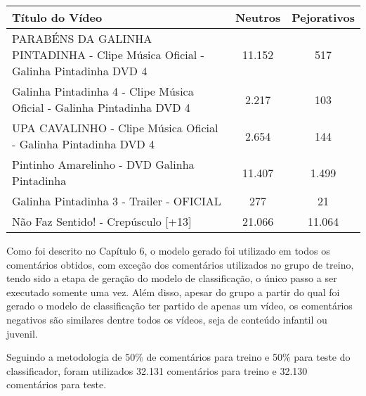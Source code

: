 \begin{table}[H] \footnotesize
\centering
\begin{tabular}{|p{5.5cm}|c|c|}
\hline
\textbf{Título do Vídeo} & \textbf{Neutros} & \textbf{Pejorativos} \\ \hline
PARABÉNS DA GALINHA PINTADINHA - Clipe Música Oficial - Galinha Pintadinha DVD 4 & 11.152 & 517 \\ \hline
Galinha Pintadinha 4 - Clipe Música Oficial - Galinha Pintadinha DVD 4 & 2.217 & 103 \\ \hline
UPA CAVALINHO - Clipe Música Oficial - Galinha Pintadinha DVD 4 & 2.654 & 144 \\ \hline
Pintinho Amarelinho - DVD Galinha Pintadinha & 11.407 & 1.499 \\ \hline
Galinha Pintadinha 3 - Trailer - OFICIAL & 277 & 21 \\ \hline
Não Faz Sentido! - Crepúsculo [+13] & 21.066 & 11.064 \\ \hline

\end{tabular}

\end{table}

Como foi descrito no Capítulo 6, o modelo gerado foi utilizado em todos os comentários obtidos, com exceção dos comentários utilizados no grupo de treino, tendo sido a etapa de geração do modelo de classificação, o único passo a ser executado somente uma vez. Além disso, apesar do grupo a partir do qual foi gerado o modelo de classificação ter partido de apenas um vídeo, os comentários negativos são similares dentre todos os vídeos, seja de conteúdo infantil ou juvenil.
\begin{comment}
\textcolor{red}{Não entendi Isaias, como você calculou recall e precision dos comentários dos outros projetos, se você não os avaliou com a SentiStregth... ou avaliou? Isso não fica claro e gera algumas dúvidas. Além disso, é bom dizer que mesmo que você tenha usado somente de um tipo de video, os comentários para criar o modelo e o testar, você tem comentários similares nos outros vídeos...}
\textcolor{pink}{I: Todos foram avaliados com Sentistrength, vou deixar mais explicito aqui e também na metodologia. Sobre os comentários similares, irei mencionar.}
\end{comment}
Seguindo a metodologia de 50\% de comentários para treino e 50\% para teste do classificador, foram utilizados 32.131 comentários para treino e 32.130 comentários para teste. 

